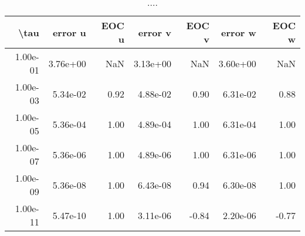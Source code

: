\begin{table}[ht]
\centering
\begin{tabular}{rrrrrrr}
  \hline
  \textbf{\textbackslash{}tau} & \textbf{error u} & \textbf{EOC u} & \textbf{error v} & \textbf{EOC v} & \textbf{error w} & \textbf{EOC w} \\\hline
  1.00e-01 & 3.76e+00 & NaN & 3.13e+00 & NaN & 3.60e+00 & NaN \\
  1.00e-03 & 5.34e-02 & 0.92 & 4.88e-02 & 0.90 & 6.31e-02 & 0.88 \\
  1.00e-05 & 5.36e-04 & 1.00 & 4.89e-04 & 1.00 & 6.31e-04 & 1.00 \\
  1.00e-07 & 5.36e-06 & 1.00 & 4.89e-06 & 1.00 & 6.31e-06 & 1.00 \\
  1.00e-09 & 5.36e-08 & 1.00 & 6.43e-08 & 0.94 & 6.30e-08 & 1.00 \\
  1.00e-11 & 5.47e-10 & 1.00 & 3.11e-06 & -0.84 & 2.20e-06 & -0.77 \\\hline
\end{tabular}
\caption{....}
\end{table}
